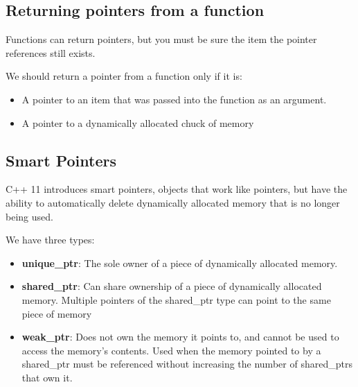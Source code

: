 \documentclass{report}
\begin{document}
    \subsection{Returning pointers from a function}
    \bigbreak \noindent 
    \begin{concept}
 Functions can return pointers, but you must be sure the item the pointer references still exists.
	\end{concept}
    \bigbreak \noindent 
    We should return  a pointer from a function only if it is:
    \begin{itemize}
        \item A pointer to an item that was passed into the function as an argument.
        \item A pointer to a dynamically allocated chuck of memory
    \end{itemize}

    \bigbreak \noindent 
    \subsection{Smart Pointers}
    \bigbreak \noindent 
    \begin{concept}
 C++ 11 introduces smart pointers, objects that work like pointers, but have the ability to automatically delete dynamically allocated memory that is no longer being used.
	\end{concept}
    \bigbreak \noindent 
    We have three types:
    \begin{itemize}
        \item \textbf{unique\_ptr}: The sole owner of a piece of dynamically allocated memory. 
        \item \textbf{shared\_ptr}: Can share ownership of a piece of dynamically allocated memory. Multiple pointers of the shared\_ptr type can point to the same piece of memory
        \item \textbf{weak\_ptr}: Does not own the memory it points to, and cannot be used to access the memory's contents. Used when the memory pointed to by a shared\_ptr must be referenced without increasing the number of shared\_ptrs that own it.
    \end{itemize}
    \bigbreak \noindent 
\end{document}
